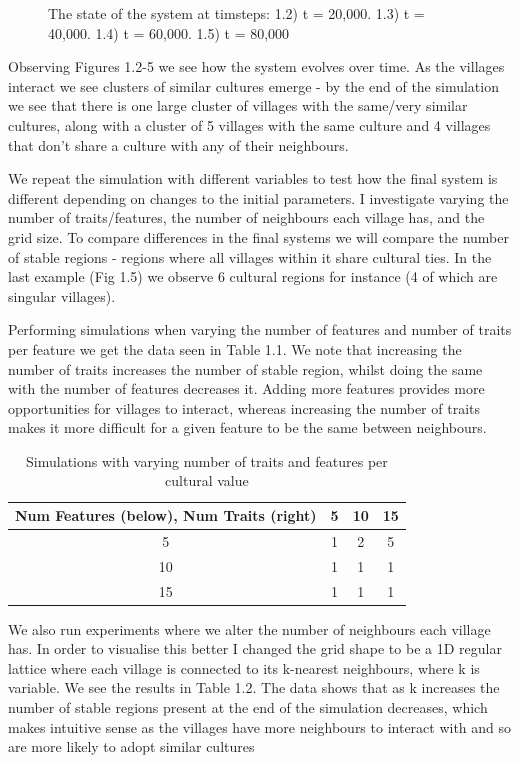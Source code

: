 \begin{figure}[t]
    \caption{The state of the system at timsteps: 1.2) t = 20,000. 1.3) t = 40,000. 1.4) t = 60,000. 1.5) t = 80,000}
    \label{fig:overall}
\end{figure}

    Observing Figures 1.2-5 we see how the system evolves over time. As the villages interact we see clusters of similar cultures emerge - by the end of the simulation we see that there is one large cluster of villages with the same/very similar cultures, along with  a cluster of 5 villages with the same culture and 4 villages that don't share a culture with any of their neighbours. 

    We repeat the simulation with different variables to test how the final system is different depending on changes to the initial parameters. I investigate varying the number of traits/features, the number of neighbours each village has, and the grid size. To compare differences in the final systems we will compare the number of stable regions - regions where all villages within it share cultural ties. In the last example (Fig 1.5) we observe 6 cultural regions for instance (4 of which are singular villages).

    Performing simulations when varying the number of features and number of traits per feature we get the data seen in Table 1.1. We note that increasing the number of traits increases the number of stable region, whilst doing the same with the number of features decreases it.  Adding more features provides more opportunities for villages to interact, whereas increasing the number of traits makes it more difficult for a given feature to be the same between neighbours.

\begin{table}[ht]
    \centering
    \begin{tabular}{c|ccc}
        Num Features (below), Num Traits (right) & 5 & 10 & 15  \\
        \hline
         5 & 1 & 2 & 5 \\
         10 & 1 & 1 & 1 \\
         15 & 1 & 1 & 1 \\
    \end{tabular}
    \caption{Simulations with varying number of traits and features per cultural value}
    \label{tab:my_label}
\end{table}

    We also run experiments where we alter the number of neighbours each village has. In order to visualise this better I changed the grid shape to be a 1D regular lattice where each village is connected to its k-nearest neighbours, where k is variable.  We see the results in Table 1.2. The data shows that as k increases the number of stable regions present at the end of the simulation decreases, which makes intuitive sense as the villages have more neighbours to interact with and so are more likely to adopt similar cultures

